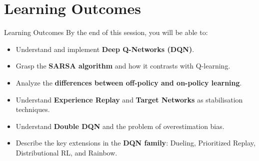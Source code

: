 \section{Learning Outcomes}
\begin{frame}{Learning Outcomes}
    \large
    By the end of this session, you will be able to:
    \vspace{0.5em}
    \begin{itemize}
        \item Understand and implement \textbf{Deep Q-Networks (DQN)}.
        \item Grasp the \textbf{SARSA algorithm} and how it contrasts with Q-learning.
        \item Analyze the \textbf{differences between off-policy and on-policy learning}.
        \item Understand \textbf{Experience Replay} and \textbf{Target Networks} as stabilisation techniques.
        \item Understand \textbf{Double DQN} and the problem of overestimation bias.
        \item Describe the key extensions in the \textbf{DQN family}: Dueling, Prioritized Replay, Distributional RL, and Rainbow.
    \end{itemize}
\end{frame}